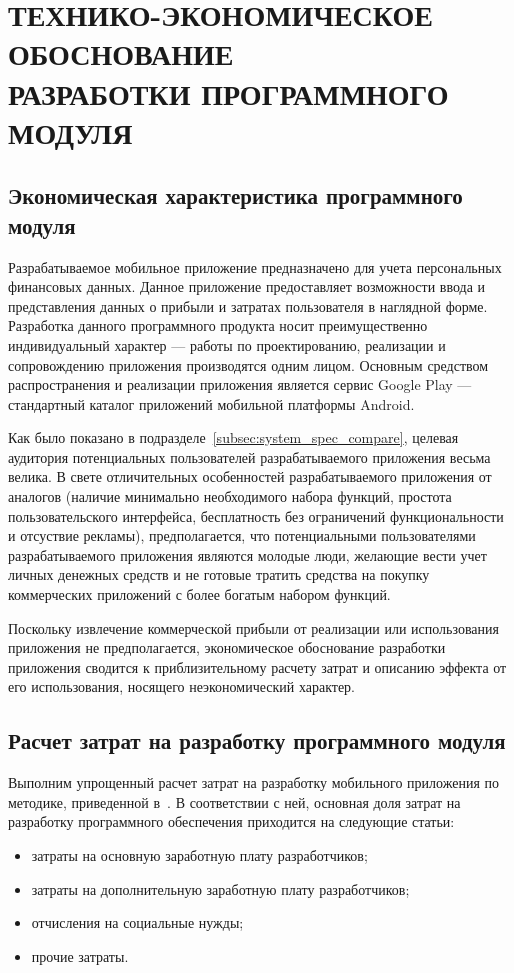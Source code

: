 \section[Технико-экономическое обоснование]{%
  ТЕХНИКО-ЭКОНОМИЧЕСКОЕ ОБОСНОВАНИЕ \\
  РАЗРАБОТКИ ПРОГРАММНОГО МОДУЛЯ
}\label{sec:teo}

\subsection{Экономическая характеристика программного модуля}

Разрабатываемое мобильное приложение предназначено для учета
персональных финансовых данных.
Данное приложение предоставляет возможности ввода и представления
данных о прибыли и затратах пользователя в наглядной форме.
Разработка данного программного продукта носит преимущественно
индивидуальный характер --- работы по проектированию, реализации и
сопровождению приложения производятся одним лицом.
Основным средством распространения и реализации приложения является сервис
Google Play --- стандартный каталог приложений мобильной платформы Android.

Как было показано в подразделе~\ref{subsec:system_spec_compare}, целевая аудитория
потенциальных пользователей разрабатываемого приложения весьма велика.
В свете отличительных особенностей разрабатываемого приложения от аналогов
(наличие минимально необходимого набора функций,
простота пользовательского интерфейса,
бесплатность без ограничений функциональности и отсуствие рекламы),
предполагается, что потенциальными пользователями разрабатываемого
приложения являются молодые люди, желающие вести учет личных денежных
средств и не готовые тратить средства на покупку коммерческих приложений
с более богатым набором функций.

Поскольку извлечение коммерческой прибыли от реализации или использования приложения
не предполагается, экономическое обоснование разработки приложения
сводится к приблизительному расчету затрат и описанию эффекта от его использования,
носящего неэкономический характер.

\subsection{Расчет затрат на разработку программного модуля}

Выполним упрощенный расчет затрат на разработку мобильного приложения
по методике, приведенной в~\cite{diploma_teo}. В соответствии с ней,
основная доля затрат на разработку программного обеспечения приходится
на следующие статьи:
\begin{itemize}
  \item затраты на основную заработную плату разработчиков;
  \item затраты на дополнительную заработную плату разработчиков;
  \item отчисления на социальные нужды;
  \item прочие затраты.
\end{itemize}

